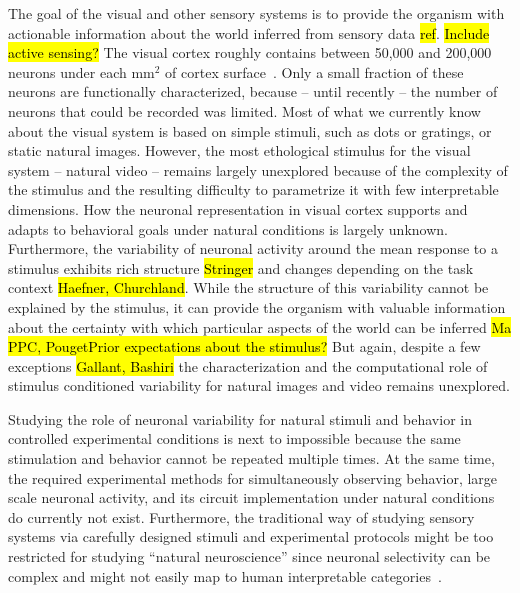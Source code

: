 \documentclass[COG,11pt]{ercgrant}
\begin{document}
The goal of the visual and other sensory systems is to provide the organism with actionable information about the world inferred from sensory data \hl{ref}. \hl{Include active sensing?} 
The visual cortex roughly contains between 50,000 and 200,000 neurons under each mm$^2$ of cortex surface~\parencite{Colonnier1981-oj}.
Only a small fraction of these neurons are functionally characterized, because -- until recently -- the number of neurons that could be recorded was limited. 
Most of what we currently know about the visual system is based on simple stimuli, such as dots or gratings, or static natural images. 
However, the most ethological stimulus for the visual system -- natural video -- remains largely unexplored because of the complexity of the stimulus and the resulting difficulty to parametrize it with few interpretable dimensions. 
How the neuronal representation in visual cortex supports and adapts to behavioral goals under natural conditions is largely unknown. 
Furthermore, the variability of neuronal activity around the mean response to a stimulus exhibits rich structure \hl{Stringer} and changes depending on the task context \hl{Haefner, Churchland}.
While the structure of this variability cannot be explained by the stimulus, it can provide the organism with valuable information about the certainty with which particular aspects of the world can be inferred \hl{Ma PPC, Pouget}\hl{Prior expectations about the stimulus?}
But again, despite a few exceptions \hl{Gallant, Bashiri} the characterization and the computational role of stimulus conditioned variability for natural images and video remains unexplored. 

Studying the role of neuronal variability for natural stimuli and behavior in controlled experimental conditions is next to impossible because the same stimulation and behavior cannot be repeated multiple times. 
At the same time, the required experimental methods for simultaneously observing behavior, large scale neuronal activity, and its circuit implementation under natural conditions do currently not exist. Furthermore, the traditional way of studying sensory systems via carefully designed stimuli and experimental protocols might be too restricted for studying ``natural neuroscience'' since neuronal selectivity can be complex and might not easily map to human interpretable categories~\parencite{Doerig2022-ex}. 
\end{document}
